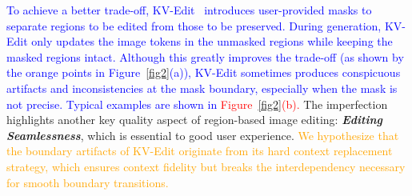 \documentclass{article}
\newcommand{\kc}[1]{\textcolor{blue}{#1}}
\begin{document}
\kc{To achieve a better trade-off, KV-Edit~\citep{zhu2025kv} introduces user-provided masks to separate regions to be edited from those to be preserved.
During generation, KV-Edit only updates the image tokens in the unmasked regions while keeping the masked regions intact.
Although this greatly improves the trade-off (as shown by the orange points in Figure~\ref{fig2}(a)), KV-Edit sometimes produces conspicuous artifacts and inconsistencies at the mask boundary, especially when the mask is not precise.
Typical examples are shown in \textcolor{red}{Figure~\ref{fig2}(b).}}
The imperfection highlights another key quality aspect of region-based image editing: \textbf{\textit{Editing Seamlessness}}, which is essential to good user experience.
\textcolor{orange}{We hypothesize that the boundary artifacts of KV-Edit originate from its hard context replacement strategy, which ensures context fidelity but breaks the interdependency necessary for smooth boundary transitions.}
\end{document}
